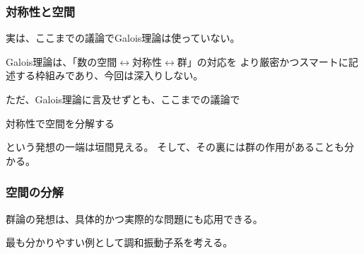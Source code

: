 \documentclass[12pt, t]{beamer}
\begin{document}
\begin{frame}
\frametitle{対称性と空間}
実は、ここまでの議論でGalois理論は\alert{使っていない}。

Galois理論は、「数の空間$\leftrightarrow$対称性$\leftrightarrow$群」の対応を
より厳密かつスマートに記述する枠組みであり、今回は深入りしない。

ただ、Galois理論に言及せずとも、ここまでの議論で
\begin{center}
対称性で空間を分解する
\end{center}
という発想の一端は垣間見える。
そして、その裏には群の作用があることも分かる。
\end{frame}

\begin{frame}
\frametitle{空間の分解}
群論の発想は、具体的かつ実際的な問題にも応用できる。

最も分かりやすい例として調和振動子系を考える。
\nocite{Kishine2009}
\end{frame}
\end{document}
